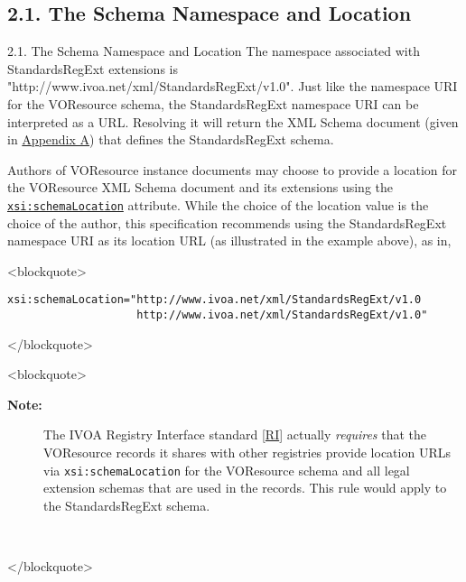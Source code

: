 \documentclass[11pt,a4paper]{ivoa}
\begin{document}
{{\subsection{2.1. The Schema Namespace and Location}

\label{}

2.1. The Schema Namespace and Location
The namespace associated with StandardsRegExt extensions is
"http://www.ivoa.net/xml/StandardsRegExt/v1.0".  
Just like the namespace URI for the VOResource schema, the
StandardsRegExt namespace URI can be interpreted as a URL.  Resolving it
will return the XML Schema document (given in \href{#appA}{Appendix A})
that defines the StandardsRegExt schema.  



Authors of VOResource instance documents may choose to
provide a location for the VOResource XML Schema document and its
extensions using the
\href{http://www.w3.org/TR/xmlschema-0/#schemaLocation}{\texttt{xsi:schemaLocation}} attribute.  While the choice of
the location value is the choice of the author, this specification
recommends using the StandardsRegExt namespace URI as its location URL
(as illustrated in the example above), as in,



<blockquote>
\begin{verbatim}xsi:schemaLocation="http://www.ivoa.net/xml/StandardsRegExt/v1.0
                    http://www.ivoa.net/xml/StandardsRegExt/v1.0"\end{verbatim}

</blockquote>



<blockquote>
\begin{table}
\begin{tabular}[FIXTHIS]

\begin{description}
\item[\textbf{Note:}] The IVOA Registry Interface standard [\href{#RI}{RI}]
       actually \emph{requires} that the VOResource records it
       shares with other registries provide location URLs via
       \texttt{xsi:schemaLocation} for the VOResource schema and
       all legal extension schemas that are used in the records.  This
       rule would apply to the StandardsRegExt schema.  

\end{description}

\\

\end{tabular}
\end{table}
</blockquote>



}}
\end{document}
